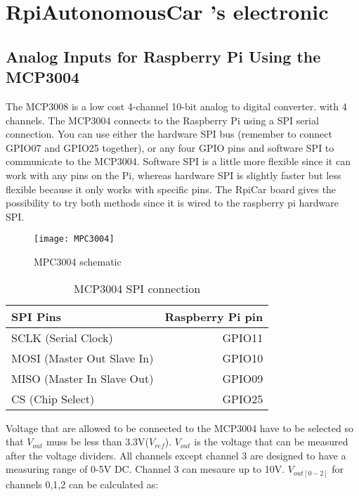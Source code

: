 \documentclass[
12pt, %
a4paper, %
oneside, %
headinclude,footinclude, %
BCOR5mm, %
]{scrartcl}
\begin{document}
\section{RpiAutonomousCar 's electronic}
\subsection{Analog Inputs for Raspberry Pi Using the MCP3004}
The MCP3008 is a low cost 4-channel 10-bit analog to digital converter.  with 4 channels. The MCP3004 connects to the Raspberry Pi using a SPI serial connection. You can use either the hardware SPI bus (remember to connect GPIO07 and GPIO25 together), or any four GPIO pins and software SPI to communicate to the MCP3004. Software SPI is a little more flexible since it can work with any pins on the Pi, whereas hardware SPI is slightly faster but less flexible because it only works with specific pins. The RpiCar board gives the possibility to try both methods since it is wired to the raspberry pi hardware SPI.

\begin{figure}[!htb]
\centering
\texttt{[image: MPC3004]} 
\caption[MPC3004 schematic]{MPC3004 schematic}
\label{fig:MPC3004}
\end{figure}

\begin{table}[hbt]
\caption{MCP3004 SPI connection}
\centering
\begin{tabular}{lr}
\toprule
SPI Pins & Raspberry Pi pin \\
\midrule
SCLK (Serial Clock)        & GPIO11 \\
MOSI (Master Out Slave In) & GPIO10 \\
MISO (Master In Slave Out) & GPIO09 \\
CS   (Chip Select)         & GPIO25 \\
\bottomrule
\end{tabular}
\label{tab:label}
\end{table}
Voltage that are allowed to be connected to the MCP3004 have to be selected so that \(V_{out}\) muss be less than 3.3V(\(V_{ref}\)). \(V_{out}\) is the voltage that can be measured after the voltage dividers. All channels except channel 3 are designed to have a measuring range of 0-5V DC. Channel 3 can mesaure up to 10V.
\(V_{out[0-2]}\) for channels 0,1,2 can be calculated as:
\end{document}
